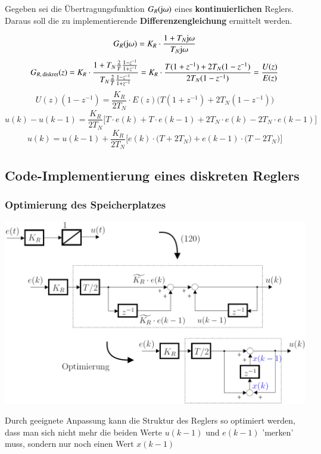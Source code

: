
Gegeben sei die Übertragungsfunktion $G_R(\mathrm{j} \omega)$ eines \textbf{kontinuierlichen} Reglers.
Daraus soll die zu implementierende \textbf{Differenzengleichung} ermittelt werden.

$$ G_R(\mathrm{j} \omega) = K_R \cdot \frac{1 + T_N \mathrm{j} \omega}{T_N \mathrm{j} \omega} $$
$$ G_{R, \, \rm diskret}(z) = K_R \cdot \frac{1 + T_N \frac{2}{T} \frac{1- z^{-1}}{1 + z^{-1}}}{T_N \frac{2}{T} \frac{1- z^{-1}}{1 + z^{-1}}} 
    = K_R \cdot \frac{T (1 + z^{-1}) + 2 T_N (1 - z^{-1})}{2 T_N (1- z^{-1})} = \frac{U(z)}{E(z)} $$
$$ U(z) (1 - z^{-1}) = \frac{K_R}{2 T_N} \cdot E(z) \Big( T (1 + z^{-1}) + 2 T_N (1 - z^{-1}) \Big) $$
$$ u(k) - u(k-1) = \frac{K_R}{2 T_N} \Big[ T \cdot e(k) + T \cdot e(k-1) + 2 T_N \cdot e(k) - 2 T_N \cdot e(k-1) \Big] $$
$$ u(k) = u(k-1) + \frac{K_R}{2 T_N} \Big[ e(k) \cdot \big( T + 2 T_N  \big) +  e(k-1) \cdot \big( T - 2 T_N  \big)  \Big]  $$


\subsection{Code-Implementierung eines diskreten Reglers}




\subsubsection{Optimierung des Speicherplatzes}

\begin{minipage}[c]{0.48\columnwidth}
     \includegraphics[width=\columnwidth]{images/optimierung_speicherplatz.png}
\end{minipage}
\hfill
\begin{minipage}[c]{0.48\columnwidth}
    Durch geeignete Anpassung kann die Struktur des Reglers so optimiert werden, dass man sich nicht mehr die beiden Werte $u(k-1)$ und $e(k-1)$
    'merken' muss, sondern nur noch einen Wert $x(k-1)$
\end{minipage}


